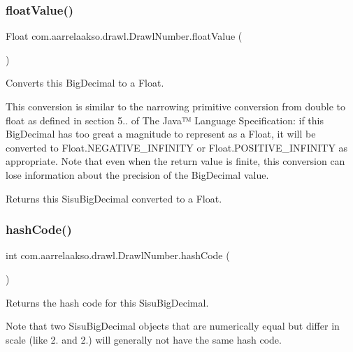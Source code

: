\subsubsection{\texorpdfstring{float\+Value()}{floatValue()}}
{\footnotesize\ttfamily Float com.\+aarrelaakso.\+drawl.\+Drawl\+Number.\+float\+Value (\begin{DoxyParamCaption}{ }\end{DoxyParamCaption})\hspace{0.3cm}{\ttfamily [protected]}}



Converts this Big\+Decimal to a Float. 

This conversion is similar to the narrowing primitive conversion from double to float as defined in section 5.. of The Java™ Language Specification\+: if this Big\+Decimal has too great a magnitude to represent as a Float, it will be converted to Float.\+N\+E\+G\+A\+T\+I\+V\+E\+\_\+\+I\+N\+F\+I\+N\+I\+TY or Float.\+P\+O\+S\+I\+T\+I\+V\+E\+\_\+\+I\+N\+F\+I\+N\+I\+TY as appropriate. Note that even when the return value is finite, this conversion can lose information about the precision of the Big\+Decimal value.

\begin{DoxyReturn}{Returns}
this Sisu\+Big\+Decimal converted to a Float. 
\end{DoxyReturn}
\mbox{\label{classcom_1_1aarrelaakso_1_1drawl_1_1_drawl_number_a0048361007923e4b902a4581eb9ba45c}} 
\subsubsection{\texorpdfstring{hash\+Code()}{hashCode()}}
{\footnotesize\ttfamily int com.\+aarrelaakso.\+drawl.\+Drawl\+Number.\+hash\+Code (\begin{DoxyParamCaption}{ }\end{DoxyParamCaption})}



Returns the hash code for this Sisu\+Big\+Decimal. 

Note that two Sisu\+Big\+Decimal objects that are numerically equal but differ in scale (like 2. and 2.) will generally not have the same hash code.

